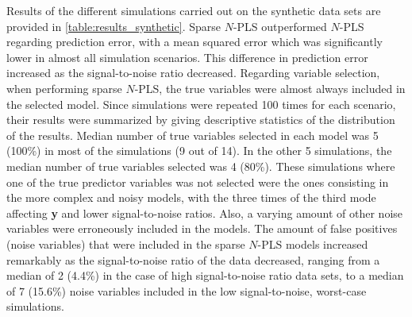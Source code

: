 Results of the different simulations carried out on the synthetic data sets are provided in \autoref{table:results_synthetic}. Sparse $N$-PLS outperformed $N$-PLS regarding prediction error, with a mean squared error which was significantly lower in almost all simulation scenarios. This difference in prediction error increased as the signal-to-noise ratio decreased. Regarding variable selection, when performing sparse $N$-PLS, the true variables were almost always included in the selected model. Since simulations were repeated 100 times for each scenario, their results were summarized by giving descriptive statistics of the distribution of the results. Median number of true variables selected in each model was 5 (100\%) in most of the simulations (9 out of 14). In the other 5 simulations, the median number of true variables selected was 4 (80\%). These simulations where one of the true predictor variables was not selected were the ones consisting in the more complex and noisy models, with the three times of the third mode affecting \textbf{y} and lower signal-to-noise ratios. Also, a varying amount of other noise variables were erroneously included in the models. The amount of false positives (noise variables) that were included in the sparse $N$-PLS models increased remarkably as the signal-to-noise ratio of the data decreased, ranging from a median of 2 (4.4\%) in the case of high signal-to-noise ratio data sets, to a median of 7 (15.6\%) noise variables included in the low signal-to-noise, worst-case simulations. 


